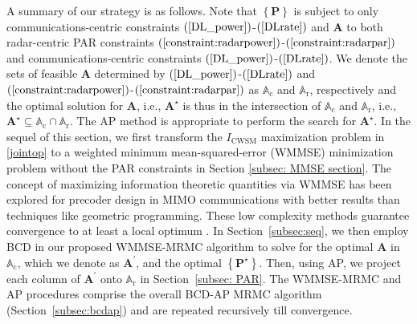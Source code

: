 \documentclass[10pt,journal]{IEEEtran}
\newcommand{\paren}[1]{\left({#1}\right)}
\newcommand{\braces}[1]{{\left\{ {#1}\right\}}}
\theoremstyle{definition}
\begin{document}
A summary of our strategy is as follows. Note that ${\braces{\mathbf{P}}}$ is subject to only communications-centric constraints $\paren{\mathrm{\ref{DL_power}}}$-$\paren{\mathrm{\ref{DLrate}}}$ and $\mathbf{A}$ to both radar-centric PAR constraints $\paren{\mathrm{\ref{constraint:radarpower}}}$-$\paren{\mathrm{\ref{constraint:radarpar}}}$ and communications-centric constraints $\paren{\mathrm{\ref{DL_power}}}$-$\paren{\mathrm{\ref{DLrate}}}$. %
We denote the sets of feasible $\mathbf{A}$ determined by $\paren{\mathrm{\ref{DL_power}}}$-$\paren{\mathrm{\ref{DLrate}}}$ and $\paren{\mathrm{\ref{constraint:radarpower}}}$-$\paren{\mathrm{\ref{constraint:radarpar}}}$ as $\mathbb{A}_{\textrm{c}}$ and $\mathbb{A}_{\textrm{r}}$, respectively and the optimal solution for $\mathbf{A}$, i.e., $\mathbf{A}^\star$ is thus in the intersection of $\mathbb{A}_{\textrm{c}}$ and $\mathbb{A}_{\textrm{r}}$, i.e., $\mathbf{A}^\star\subseteq\mathbb{A}_{\textrm{c}}\cap\mathbb{A}_{\textrm{r}}$. The AP method \cite{arXiv180203889Z,nearestvector} is appropriate to perform the search for $\mathbf{A}^\star$. In the sequel of this section, we first transform the $I_{\textrm{CWSM}}$ maximization problem in \eqref{jointop} to a weighted minimum mean-squared-error (WMMSE) minimization problem without the PAR constraints in Section \ref{subsec: MMSE section}. The concept of maximizing information theoretic quantities via WMMSE has been explored for precoder design in MIMO communications \cite{Luo2011IterativeWMMSE,FD_WMMSE} with better results than techniques like  geometric programming. These low complexity methods guarantee convergence to at least a local optimum \cite{Luo2011IterativeWMMSE}. In Section~\ref{subsec:seq}, we then employ BCD in our proposed WMMSE-MRMC algorithm to solve for the optimal $\mathbf{A}$ in $\mathbb{A}_{\textrm{c}}$, which we denote as $\mathbf{A}^\prime$, and the optimal %
$\braces{\mathbf{P}^\star}$. %
   Then, using AP, we project each column of $\mathbf{A}^\prime$ onto $\mathbb{A}_{\textrm{r}}$ in Section~\ref{subsec: PAR}. The WMMSE-MRMC and AP procedures comprise the overall BCD-AP MRMC algorithm (Section~\ref{subsec:bcdap}) and are repeated recursively till convergence.
\end{document}
